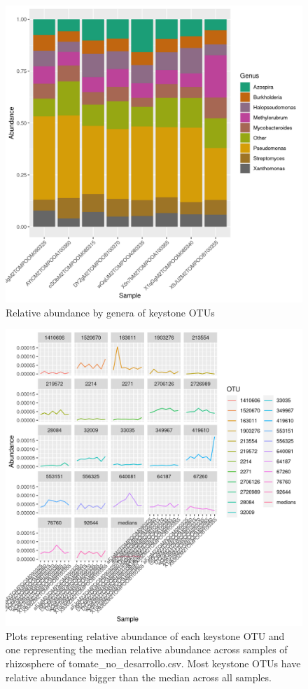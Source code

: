 \begin{figure}
\centering
\includegraphics[scale = 0.8]{tomate_no_desarrollo.csv_relative_abundance_Genus.png}
\caption{Relative abundance by genera of keystone OTUs }
\label{fig:tomate_no_desarrollo.csv_genus}
\end{figure}
\begin{figure}
   \centering
   \includegraphics[scale = 0.8]{abundance_tomate_no_desarrollo.csv_key_otus_medians.png}
   \caption{Plots representing relative abundance of each keystone OTU and one representing the median relative abundance  across samples of rhizosphere of tomate_no_desarrollo.csv. Most keystone OTUs have relative abundance bigger than the median across all samples.  }
   \label{key_otus_vs_medians_tomate_no_desarrollo.csv}
\end{figure}
